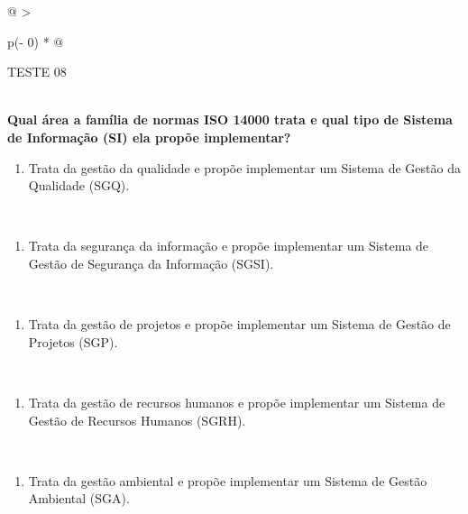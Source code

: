 \documentclass[
]{book}
\providecommand{\tightlist}{%
  \setlength{\itemsep}{0pt}\setlength{\parskip}{0pt}}
\begin{document}
\begin{longtable}[]{@{}
  >{\raggedright\arraybackslash}p{(\columnwidth - 0\tabcolsep) * }@{}}
\toprule\noalign{}
\begin{minipage}[b]{\linewidth}\raggedright
TESTE 08
\end{minipage} \\
\midrule\noalign{}
\endhead
\bottomrule\noalign{}
\endlastfoot
\textbf{Qual área a família de normas ISO 14000 trata e qual tipo de Sistema de Informação (SI) ela propõe implementar?} \\
\begin{minipage}[t]{\linewidth}\raggedright
\begin{enumerate}
\def\labelenumi{\alph{enumi})}
\tightlist
\item
  Trata da gestão da qualidade e propõe implementar um Sistema de Gestão da Qualidade (SGQ).
\end{enumerate}
\end{minipage} \\
\begin{minipage}[t]{\linewidth}\raggedright
\begin{enumerate}
\def\labelenumi{\alph{enumi})}
\setcounter{enumi}{1}
\tightlist
\item
  Trata da segurança da informação e propõe implementar um Sistema de Gestão de Segurança da Informação (SGSI).
\end{enumerate}
\end{minipage} \\
\begin{minipage}[t]{\linewidth}\raggedright
\begin{enumerate}
\def\labelenumi{\alph{enumi})}
\setcounter{enumi}{2}
\tightlist
\item
  Trata da gestão de projetos e propõe implementar um Sistema de Gestão de Projetos (SGP).
\end{enumerate}
\end{minipage} \\
\begin{minipage}[t]{\linewidth}\raggedright
\begin{enumerate}
\def\labelenumi{\alph{enumi})}
\setcounter{enumi}{3}
\tightlist
\item
  Trata da gestão de recursos humanos e propõe implementar um Sistema de Gestão de Recursos Humanos (SGRH).
\end{enumerate}
\end{minipage} \\
\begin{minipage}[t]{\linewidth}\raggedright
\begin{enumerate}
\def\labelenumi{\alph{enumi})}
\setcounter{enumi}{4}
\tightlist
\item
  Trata da gestão ambiental e propõe implementar um Sistema de Gestão Ambiental (SGA).
\end{enumerate}
\end{minipage} \\
\end{longtable}
\end{document}
